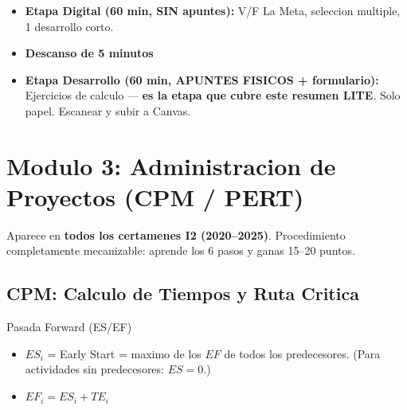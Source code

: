 \documentclass[11pt, a4paper]{article}
\begin{document}
\begin{titlepage}
  \vspace{0.4cm}

  \begin{estructuraprueba}
    \begin{itemize}[leftmargin=1.2em, itemsep=3pt]
      \item \textbf{Etapa Digital (60 min, SIN apuntes):}
        V/F La Meta, seleccion multiple, 1 desarrollo corto.
      \item \textbf{Descanso de 5 minutos}
      \item \textbf{Etapa Desarrollo (60 min, APUNTES FISICOS + formulario):}
        Ejercicios de calculo --- \textbf{es la etapa que cubre este resumen LITE}.
        Solo papel. Escanear y subir a Canvas.
    \end{itemize}
  \end{estructuraprueba}

  \vfill
\end{titlepage}

\tableofcontents
\newpage

\section[Modulo 3: Proyectos PERT/CPM]{Modulo 3: Administracion de Proyectos (CPM / PERT)}

Aparece en \textbf{todos los certamenes I2 (2020--2025)}.
Procedimiento completamente mecanizable: aprende los 6 pasos y ganas 15--20 puntos.

\subsection{CPM: Calculo de Tiempos y Ruta Critica}

\begin{formulas}{Pasada Forward (ES/EF)}
  \begin{itemize}[leftmargin=1.2em, itemsep=2pt]
    \item $ES_i$ = Early Start = maximo de los $EF$ de todos los predecesores.
          (Para actividades sin predecesores: $ES = 0$.)
    \item $EF_i = ES_i + TE_i$
  \end{itemize}
\end{formulas}
\end{document}
